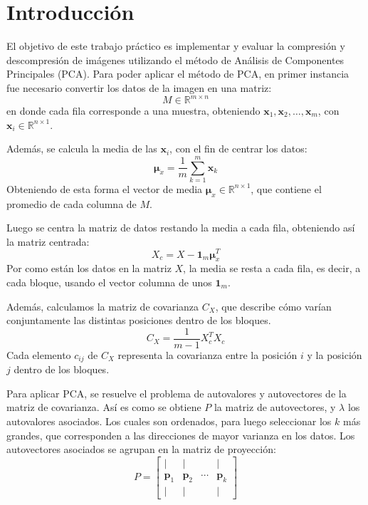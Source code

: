 \documentclass[a4paper,12pt]{article}
\begin{document}
\newpage
\section*{Introducción}
El objetivo de este trabajo práctico es implementar y evaluar la compresión y descompresión de imágenes utilizando el método de Análisis de Componentes Principales (PCA).
Para poder aplicar el método de PCA, en primer instancia fue necesario convertir los datos de la imagen en una matriz:
\begin{equation}
M \in \mathbb{R}^{m \times n}
\label{eq:matrizM}
\end{equation}
en donde cada fila corresponde a una muestra, obteniendo $\mathbf{x}_1, \mathbf{x}_2, \ldots, \mathbf{x}_m$, con $\mathbf{x}_i \in \mathbb{R}^{n \times 1}$.

Además, se calcula la media de las $\mathbf{x}_i$, con el fin de centrar los datos:
\begin{equation}
\boldsymbol{\mu}_x = \frac{1}{m} \sum_{k=1}^m \mathbf{x}_{k}
\label{eq:media}
\end{equation}
Obteniendo de esta forma el vector de media $\boldsymbol{\mu}_x \in \mathbb{R}^{n \times 1}$, que contiene el promedio de cada columna de $M$.

Luego se centra la matriz de datos restando la media a cada fila, obteniendo así la matriz centrada:
\begin{equation}
X_c = X - \mathbf{1}_m \boldsymbol{\mu}_x^T
\label{eq:centrado}
\end{equation}
Por como están los datos en la matriz $X$, la media se resta a cada fila, es decir, a cada bloque, usando el vector columna de unos $\mathbf{1}_m$.

Además, calculamos la matriz de covarianza $C_X$, que describe cómo varían conjuntamente las distintas posiciones dentro de los bloques. 
\begin{equation}
C_X = \frac{1}{m-1} X_c^T X_c
\label{eq:covarianza}
\end{equation}
Cada elemento $c_{ij}$ de $C_X$ representa la covarianza entre la posición $i$ y la posición $j$ dentro de los bloques.

Para aplicar PCA, se resuelve el problema de autovalores y autovectores de la matriz de covarianza.
Así es como se obtiene $P$ la matriz de autovectores, y $\lambda$ los autovalores asociados. Los cuales son ordenados, para luego seleccionar los $k$ más grandes, que corresponden a las direcciones de mayor varianza en los datos. Los autovectores asociados se agrupan en la matriz de proyección:
\begin{equation}
P = \begin{bmatrix}
| & | &        & | \\
\mathbf{p}_1 & \mathbf{p}_2 & \cdots & \mathbf{p}_k \\
| & | &        & |
\end{bmatrix}
\label{eq:autovectores}
\end{equation}
\end{document}

